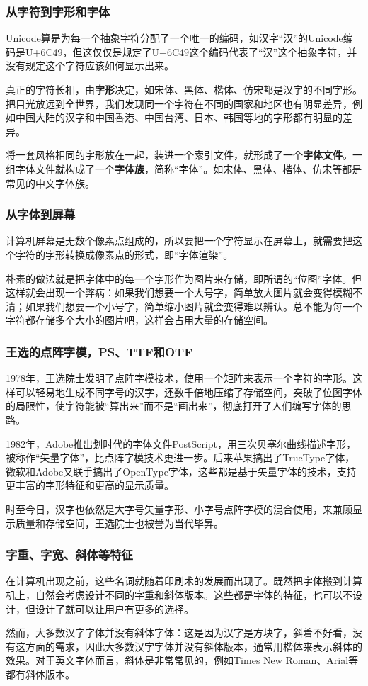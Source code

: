 \documentclass[fontset=none,aspectratio=1610]{ctexbeamer}
\begin{document}
\begin{frame}
    \frametitle{从字符到字形和字体}

    Unicode算是为每一个抽象字符分配了一个唯一的编码，如汉字“汉”的Unicode编码是U+6C49，但这仅仅是规定了U+6C49这个编码代表了“汉”这个抽象字符，并没有规定这个字符应该如何显示出来。

    真正的字符长相，由\textbf{字形}决定，如宋体、黑体、楷体、仿宋都是汉字的不同字形。把目光放远到全世界，我们发现同一个字符在不同的国家和地区也有明显差异，例如中国大陆的汉字和中国香港、中国台湾、日本、韩国等地的字形都有明显的差异。

    将一套风格相同的字形放在一起，装进一个索引文件，就形成了一个\textbf{字体文件}。一组字体文件就构成了一个\textbf{字体族}，简称“字体”。如宋体、黑体、楷体、仿宋等都是常见的中文字体族。

\end{frame}

\begin{frame}
    \frametitle{从字体到屏幕}

    计算机屏幕是无数个像素点组成的，所以要把一个字符显示在屏幕上，就需要把这个字符的字形转换成像素点的形式，即“字体渲染”。

    朴素的做法就是把字体中的每一个字形作为图片来存储，即所谓的“位图”字体。但这样就会出现一个弊病：如果我们想要一个大号字，简单放大图片就会变得模糊不清；如果我们想要一个小号字，简单缩小图片就会变得难以辨认。总不能为每一个字符都存储多个大小的图片吧，这样会占用大量的存储空间。

\end{frame}

\begin{frame}
    \frametitle{王选的点阵字模，PS、TTF和OTF}

    1978年，王选院士发明了点阵字模技术，使用一个矩阵来表示一个字符的字形。这样可以轻易地生成不同字号的汉字，还数千倍地压缩了存储空间，突破了位图字体的局限性，使字符能被“算出来”而不是“画出来”，彻底打开了人们编写字体的思路。

    1982年，Adobe推出划时代的字体文件PostScript，用三次贝塞尔曲线描述字形，被称作“矢量字体”，比点阵字模技术更进一步。后来苹果搞出了TrueType字体，微软和Adobe又联手搞出了OpenType字体，这些都是基于矢量字体的技术，支持更丰富的字形特征和更高的显示质量。

    时至今日，汉字也依然是大字号矢量字形、小字号点阵字模的混合使用，来兼顾显示质量和存储空间，王选院士也被誉为当代毕昇。

\end{frame}

\begin{frame}
    \frametitle{字重、字宽、斜体等特征}

    在计算机出现之前，这些名词就随着印刷术的发展而出现了。既然把字体搬到计算机上，自然会考虑设计不同的字重和斜体版本。这些都是字体的特征，也可以不设计，但设计了就可以让用户有更多的选择。

    然而，大多数汉字字体并没有斜体字体：这是因为汉字是方块字，斜着不好看，没有这方面的需求，因此大多数汉字字体并没有斜体版本，通常用楷体来表示斜体的效果。对于英文字体而言，斜体是非常常见的，例如Times New Roman、Arial等都有斜体版本。

\end{frame}
\end{document}
